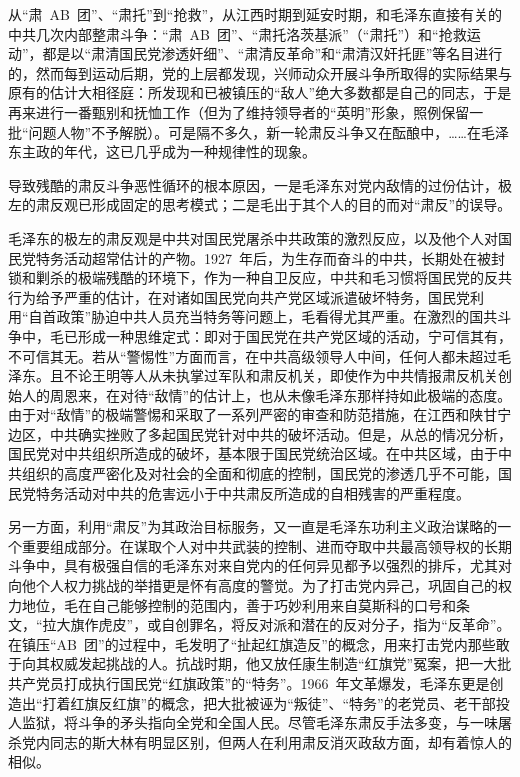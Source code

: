 从“肃~AB~团”、“肃托”到“抢救”，从江西时期到延安时期，和毛泽东直接有关的中共几次内部整肃斗争：“肃~AB~团”、“肃托洛茨基派”（“肃托”）和“抢救运动”，都是以“肃清国民党渗透奸细”、“肃清反革命”和“肃清汉奸托匪”等名目进行的，然而每到运动后期，党的上层都发现，兴师动众开展斗争所取得的实际结果与原有的估计大相径庭：所发现和已被镇压的“敌人”绝大多数都是自己的同志，于是再来进行一番甄别和抚恤工作（但为了维持领导者的“英明”形象，照例保留一批“问题人物”不予解脱）。可是隔不多久，新一轮肃反斗争又在酝酿中，……在毛泽东主政的年代，这已几乎成为一种规律性的现象。

导致残酷的肃反斗争恶性循环的根本原因，一是毛泽东对党内敌情的过份估计，极左的肃反观已形成固定的思考模式；二是毛出于其个人的目的而对“肃反”的误导。

毛泽东的极左的肃反观是中共对国民党屠杀中共政策的激烈反应，以及他个人对国民党特务活动超常估计的产物。1927~年后，为生存而奋斗的中共，长期处在被封锁和剿杀的极端残酷的环境下，作为一种自卫反应，中共和毛习惯将国民党的反共行为给予严重的估计，在对诸如国民党向共产党区域派遣破坏特务，国民党利用“自首政策”胁迫中共人员充当特务等问题上，毛看得尤其严重。在激烈的国共斗争中，毛已形成一种思维定式：即对于国民党在共产党区域的活动，宁可信其有，不可信其无。若从“警惕性”方面而言，在中共高级领导人中间，任何人都未超过毛泽东。且不论王明等人从未执掌过军队和肃反机关，即使作为中共情报肃反机关创始人的周恩来，在对待“敌情”的估计上，也从未像毛泽东那样持如此极端的态度。由于对“敌情”的极端警惕和采取了一系列严密的审查和防范措施，在江西和陕甘宁边区，中共确实挫败了多起国民党针对中共的破坏活动。但是，从总的情况分析，国民党对中共组织所造成的破坏，基本限于国民党统治区域。在中共区域，由于中共组织的高度严密化及对社会的全面和彻底的控制，国民党的渗透几乎不可能，国民党特务活动对中共的危害远小于中共肃反所造成的自相残害的严重程度。

另一方面，利用“肃反”为其政治目标服务，又一直是毛泽东功利主义政治谋略的一个重要组成部分。在谋取个人对中共武装的控制、进而夺取中共最高领导权的长期斗争中，具有极强自信的毛泽东对来自党内的任何异见都予以强烈的排斥，尤其对向他个人权力挑战的举措更是怀有高度的警觉。为了打击党内异己，巩固自己的权力地位，毛在自己能够控制的范围内，善于巧妙利用来自莫斯科的口号和条文，“拉大旗作虎皮”，或自创罪名，将反对派和潜在的反对分子，指为“反革命”。在镇压“AB~团”的过程中，毛发明了“扯起红旗造反”的概念，用来打击党内那些敢于向其权威发起挑战的人。抗战时期，他又放任康生制造“红旗党”冤案，把一大批共产党员打成执行国民党“红旗政策”的“特务”。1966~年文革爆发，毛泽东更是创造出“打着红旗反红旗”的概念，把大批被诬为“叛徒”、“特务”的老党员、老干部投人监狱，将斗争的矛头指向全党和全国人民。尽管毛泽东肃反手法多变，与一味屠杀党内同志的斯大林有明显区别，但两人在利用肃反消灭政敌方面，却有着惊人的相似。

